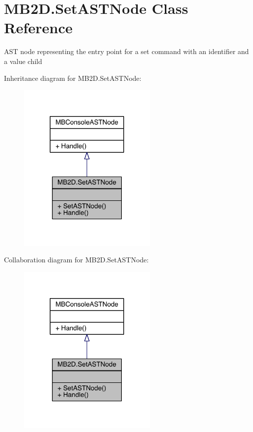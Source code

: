 \hypertarget{class_m_b2_d_1_1_set_a_s_t_node}{}\section{M\+B2\+D.\+Set\+A\+S\+T\+Node Class Reference}
\label{class_m_b2_d_1_1_set_a_s_t_node}


A\+ST node representing the entry point for a \textquotesingle{}set\textquotesingle{} command with an identifier and a value child  




Inheritance diagram for M\+B2\+D.\+Set\+A\+S\+T\+Node\+:
\nopagebreak
\begin{figure}[H]
\begin{center}
\leavevmode
\includegraphics[width=191pt]{class_m_b2_d_1_1_set_a_s_t_node__inherit__graph}
\end{center}
\end{figure}


Collaboration diagram for M\+B2\+D.\+Set\+A\+S\+T\+Node\+:
\nopagebreak
\begin{figure}[H]
\begin{center}
\leavevmode
\includegraphics[width=191pt]{class_m_b2_d_1_1_set_a_s_t_node__coll__graph}
\end{center}
\end{figure}
